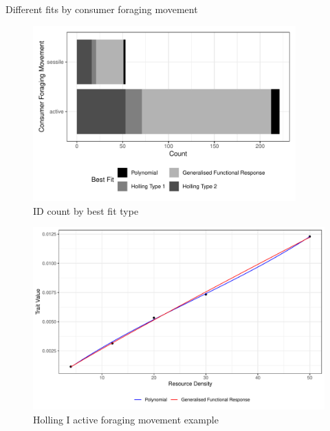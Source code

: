 \documentclass[11pt, a4paper, titlepage]{article}
\begin{document}
\begin{table}[ht!]
\centering{}
\caption{Different fits by consumer foraging movement}
\end{table}

\begin{figure}[ht!]
	\centering\includegraphics[width=0.9\textwidth]{../Results/ConForaging_Comparison_Barchart.pdf}
	\caption{ID count by best fit type}
\end{figure}

\begin{figure}[ht!]
	\centering\includegraphics[width=1\textwidth]{../Results/Holling1_example.pdf}
	\caption{Holling I active foraging movement example}
\end{figure}
\end{document}
